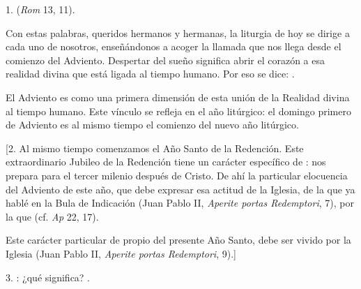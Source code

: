 
\begin{body}
	1.  (\emph{Rom} 13, 11).
	
	Con estas palabras, queridos hermanos y hermanas, la liturgia de hoy se dirige a cada uno de nosotros, enseñándonos a acoger la llamada que nos llega desde el comienzo del Adviento. Despertar del sueño significa abrir el corazón a esa realidad divina que está ligada al tiempo humano. Por eso se dice: .
	
	El Adviento es como una primera dimensión de esta unión de la Realidad divina al tiempo humano. Este vínculo se refleja en el año litúrgico: el domingo primero de Adviento es al mismo tiempo el comienzo del nuevo año litúrgico.
	
	{[}2. Al mismo tiempo comenzamos el Año Santo de la Redención. Este extraordinario Jubileo de la Redención tiene un carácter específico de : nos prepara para el tercer milenio después de Cristo. De ahí la particular elocuencia del Adviento de este año, que debe expresar esa actitud de la Iglesia, de la que ya hablé en la Bula de Indicación (Juan Pablo II, \emph{Aperite portas Redemptori}, 7), por la que  (cf. \emph{Ap} 22, 17).
	
	Este carácter particular de  propio del presente Año Santo, debe ser vivido por la Iglesia  (Juan Pablo II, \emph{Aperite portas Redemptori}, 9).{]}
	
	3. : ¿qué significa? .
	

\end{body}
